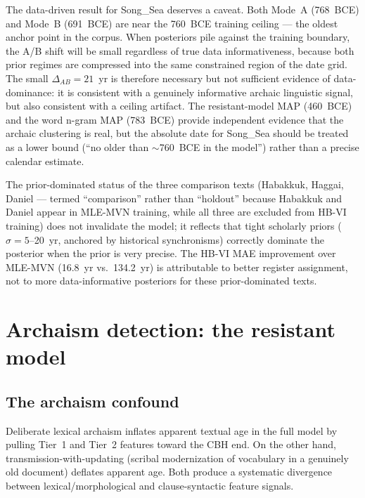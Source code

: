 \documentclass[10pt,letterpaper]{article}
\newcommand{\cbh}{CBH}
\newcommand{\mvn}{MLE-MVN}
\newcommand{\hbvi}{HB-VI}
\begin{document}
The data-driven result for Song\_Sea deserves a caveat.  Both Mode~A
(768~BCE) and Mode~B (691~BCE) are near the 760~BCE training ceiling ---
the oldest anchor point in the corpus.  When posteriors pile against the
training boundary, the A/B shift will be small regardless of true data
informativeness, because both prior regimes are compressed into the same
constrained region of the date grid.  The small $\Delta_{AB} = 21$~yr
is therefore necessary but not sufficient evidence of data-dominance:
it is consistent with a genuinely informative archaic linguistic signal,
but also consistent with a ceiling artifact.  The resistant-model MAP
(460~BCE) and the word n-gram MAP (783~BCE) provide independent evidence
that the archaic clustering is real, but the absolute date for Song\_Sea
should be treated as a lower bound (``no older than $\sim$760~BCE in the
model'') rather than a precise calendar estimate.

The prior-dominated status of the three comparison texts (Habakkuk,
Haggai, Daniel --- termed ``comparison'' rather than ``holdout'' because
Habakkuk and Daniel appear in MLE-MVN training, while all three are
excluded from HB-VI training) does not invalidate the model; it reflects
that tight scholarly priors ($\sigma = 5$--20~yr, anchored by historical
synchronisms) correctly dominate the posterior when the prior is very
precise.  The \hbvi{} MAE improvement over \mvn{}
(16.8~yr vs.\ 134.2~yr) is attributable to better register assignment,
not to more data-informative posteriors for these prior-dominated texts.

\section*{Archaism detection: the resistant model}

\subsection*{The archaism confound}

Deliberate lexical archaism inflates apparent textual age in the full model
by pulling Tier~1 and Tier~2 features toward the \cbh{} end.
On the other hand, transmission-with-updating (scribal modernization of
vocabulary in a genuinely old document) deflates apparent age.  Both
produce a systematic divergence between lexical/morphological and
clause-syntactic feature signals.
\end{document}
